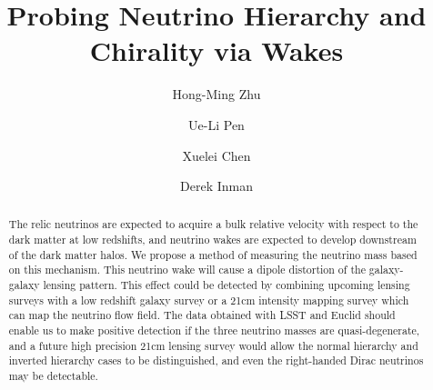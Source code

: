 \documentclass[aps,prl,twocolumn,showpacs,superscriptaddress,groupedaddress,nofootinbib]{revtex4}  %
\begin{document}
\widetext

\title{Probing Neutrino Hierarchy and Chirality via Wakes}

\author{Hong-Ming Zhu} 

\author{Ue-Li Pen} 

\author{Xuelei Chen}

\author{Derek Inman} 

\begin{abstract}
The relic neutrinos are expected to acquire a bulk relative velocity with 
respect to the dark matter at low redshifts, and neutrino wakes are expected to develop 
downstream of the dark matter halos.  We propose a method of 
measuring the neutrino mass based on this mechanism.  
This neutrino wake will cause a dipole distortion of the galaxy-galaxy
lensing pattern.  This effect could be detected by combining upcoming lensing 
surveys
with a low redshift galaxy survey or 
a 21cm intensity mapping survey which can map the neutrino flow 
field.  The data obtained with LSST and Euclid 
should enable us to make positive detection if the three
neutrino masses are quasi-degenerate, and a future high precision 
21cm lensing survey would allow the normal hierarchy and inverted 
hierarchy cases to be distinguished, 
and even the right-handed Dirac neutrinos may be detectable.
\end{abstract}

\pacs{}
\maketitle
\end{document}
